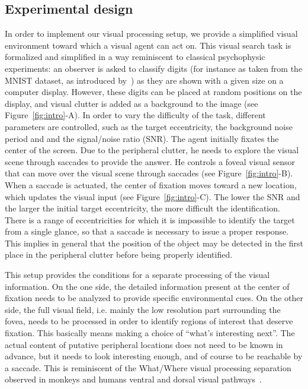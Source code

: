 \subsection{Experimental design}

In order to implement our visual processing setup,
we provide a simplified visual environment toward which a visual agent can act on.
This visual search task is formalized and simplified in a way reminiscent to classical psychophysic experiments: an observer is asked to classify digits (for instance as taken from the MNIST dataset, as introduced by~\cite{Lecun1998}) as they are shown with a given size on a computer display.
However, these digits can be placed at random positions on the display, and visual clutter is added as a background to the image (see Figure~\ref{fig:intro}-A).
In order to vary the difficulty of the task, different parameters are controlled, such as the target eccentricity, the background noise period and and the signal/noise ratio (SNR).
The agent initially fixates the center of the screen. Due to the peripheral clutter, he needs to explore the visual scene through saccades to provide the answer. He controls a foveal visual sensor that can move over the visual scene through saccades (see Figure~\ref{fig:intro}-B). When a saccade is actuated, the center of fixation moves toward a new location, which updates the visual input (see Figure~\ref{fig:intro}-C).
The lower the SNR and the larger the initial target eccentricity, the more difficult the identification. There is a range of eccentricities for which it is impossible to identify the target from a single glance, so that a saccade is necessary to issue a proper response.
This implies in general that the position of the object may be detected in the first place in the peripheral clutter before being properly identified.

This setup provides the conditions for a separate processing of the visual information.
On the one side, the detailed information present at the center of fixation needs to be analyzed to provide specific environmental cues.
On the other side, the full visual field, i.e. mainly the low resolution part surrounding the fovea, needs to be processed in order to identify regions of interest that deserve fixation. This basically means making a choice of “what’s interesting next”. The actual content of putative peripheral locations does not need to be known in advance, but it needs to look interesting enough, and of course to be reachable by a saccade. This is reminiscent of the What/Where visual processing separation observed in monkeys and humans ventral and dorsal visual pathways~\cite{mishkin1983object}.

